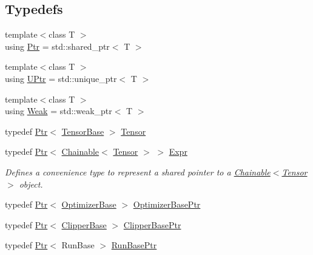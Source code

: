 \subsection*{Typedefs}
\begin{DoxyCompactItemize}
\item 
{\footnotesize template$<$class T $>$ }\\using \hyperlink{namespacemarian_ad1a373be43a00ef9ce35666145137b08}{Ptr} = std\+::shared\+\_\+ptr$<$ T $>$
\item 
{\footnotesize template$<$class T $>$ }\\using \hyperlink{namespacemarian_aef1c1bbe14b70285b1e8f7653f134cb1}{U\+Ptr} = std\+::unique\+\_\+ptr$<$ T $>$
\item 
{\footnotesize template$<$class T $>$ }\\using \hyperlink{namespacemarian_acde6307b95538fbf82548c2e1108ccf4}{Weak} = std\+::weak\+\_\+ptr$<$ T $>$
\item 
typedef \hyperlink{namespacemarian_ad1a373be43a00ef9ce35666145137b08}{Ptr}$<$ \hyperlink{classmarian_1_1TensorBase}{Tensor\+Base} $>$ \hyperlink{namespacemarian_a88b71ec34bb354564cddc24eb80f7e14}{Tensor}
\item 
typedef \hyperlink{namespacemarian_ad1a373be43a00ef9ce35666145137b08}{Ptr}$<$ \hyperlink{classmarian_1_1Chainable}{Chainable}$<$ \hyperlink{namespacemarian_a88b71ec34bb354564cddc24eb80f7e14}{Tensor} $>$ $>$ \hyperlink{namespacemarian_a498d8baf75b754011078b890b39c8e12}{Expr}
\begin{DoxyCompactList}\small\item\em Defines a convenience type to represent a shared pointer to a \hyperlink{classmarian_1_1Chainable}{Chainable$<$\+Tensor$>$} object. \end{DoxyCompactList}\item 
typedef \hyperlink{namespacemarian_ad1a373be43a00ef9ce35666145137b08}{Ptr}$<$ \hyperlink{classmarian_1_1OptimizerBase}{Optimizer\+Base} $>$ \hyperlink{namespacemarian_a63563426eab459d09fa044eb645c71e1}{Optimizer\+Base\+Ptr}
\item 
typedef \hyperlink{namespacemarian_ad1a373be43a00ef9ce35666145137b08}{Ptr}$<$ \hyperlink{classmarian_1_1ClipperBase}{Clipper\+Base} $>$ \hyperlink{namespacemarian_ae7082987f4bcf1b02bf5b23e1ebebacb}{Clipper\+Base\+Ptr}
\item 
typedef \hyperlink{namespacemarian_ad1a373be43a00ef9ce35666145137b08}{Ptr}$<$ Run\+Base $>$ \hyperlink{namespacemarian_a0b57f584ee553f4bbacf654ce953f1a5}{Run\+Base\+Ptr}
\item 

\end{DoxyCompactItemize}
